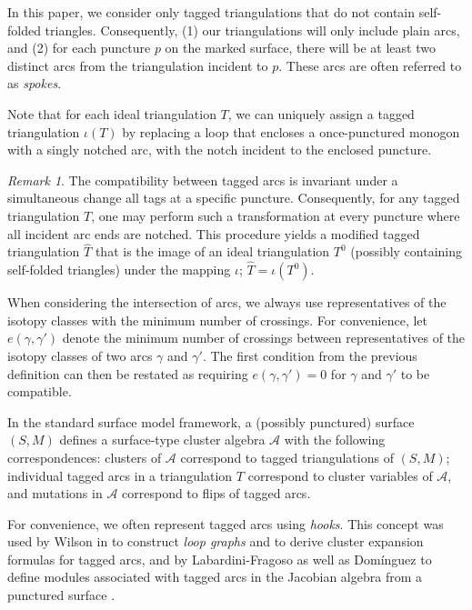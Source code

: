 \documentclass{article}
\theoremstyle{remark}
\newtheorem{remark}{Remark}
\begin{document}
In this paper, we consider only tagged triangulations that do not contain self-folded triangles. Consequently, (1) our triangulations will only include plain arcs, and (2) for each puncture \(p\) on the marked surface, there will be at least two distinct arcs from the triangulation incident to \(p\). These arcs are often referred to as \emph{spokes}.

Note that for each ideal triangulation \(T\), we can uniquely assign a tagged triangulation \(\iota(T)\) by replacing a loop that encloses a once-punctured monogon with a singly notched arc, with the notch incident to the enclosed puncture.

\begin{remark}\label{re:incomp_tag_plain}
The compatibility between tagged arcs is invariant under a simultaneous change all tags at a specific puncture. Consequently, for any tagged triangulation $T$, one may perform such a transformation at every puncture where all incident arc ends are notched. This procedure yields a modified tagged triangulation $\hat{T}$ that is the image of an ideal triangulation $T^0$ (possibly containing self-folded triangles) under the mapping $\iota$; $\hat{T} = \iota(T^0)$.
\end{remark}

When considering the intersection of arcs, we always use representatives of the isotopy classes with the minimum number of crossings. For convenience, let \(e(\gamma,\gamma')\) denote the minimum number of crossings between representatives of the isotopy classes of two arcs \(\gamma\) and \(\gamma'\). The first condition from the previous definition can then be restated as requiring \(e(\gamma,\gamma') = 0\) for \(\gamma\) and \(\gamma'\) to be compatible.

In the standard surface model framework, a (possibly punctured) surface \((S,M)\) defines a surface-type cluster algebra \(\mathcal{A}\) with the following correspondences: clusters of \(\mathcal{A}\) correspond to tagged triangulations of \((S,M)\); individual tagged arcs in a triangulation \(T\) correspond to cluster variables of \(\mathcal{A}\), and mutations in \(\mathcal{A}\) correspond to flips of tagged arcs.

For convenience, we often represent tagged arcs using \emph{hooks}. This concept was used by Wilson in \cite{wilson2020surface} to construct \emph{loop graphs} and to derive cluster expansion formulas for tagged arcs, and by Labardini-Fragoso as well as Domínguez to define modules associated with tagged arcs in the Jacobian algebra from a punctured surface \cite{dominguez2017arc}.
\end{document}
